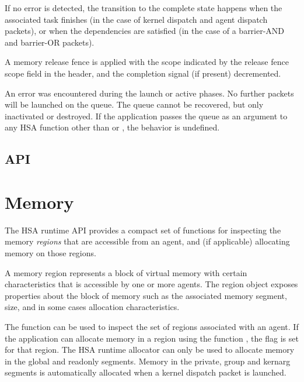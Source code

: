\documentclass[final,oneside]{book}
\begin{document}
\begin{description}[itemsep=2pt,leftmargin=0cm, labelindent=0cm]
  If no error is detected, the transition to the complete state happens when the
  associated task finishes (in the case of kernel dispatch and agent dispatch
  packets), or when the dependencies are satisfied (in the case of a barrier-AND
  and barrier-OR packets).

\item[Complete] A memory release fence is applied with the scope indicated by
  the release fence scope field in the header, and the completion signal (if
  present) decremented.

\item[Error] An error was encountered during the launch or active phases. No
  further packets will be launched on the queue. The queue cannot be recovered,
  but only inactivated or destroyed. If the application passes the queue as an
  argument to any HSA function other than  or
  , the behavior is undefined.

\end{description}


\subsection{API}


\section{Memory}\label{sec:memory}

The HSA runtime API provides a compact set of functions for inspecting the
memory \emph{regions} that are accessible from an agent, and (if applicable)
allocating memory on those regions.

A memory region represents a block of virtual memory with certain
characteristics that is accessible by one or more agents. The region object
 exposes properties about the block of memory such as the
associated memory segment, size, and in some cases allocation characteristics.

The function  can be used to inspect the set
of regions associated with an agent.  If the application can allocate memory
in a region using the function , the flag
 is set for that region. The HSA
runtime allocator can only be used to allocate memory in the global and readonly
segments. Memory in the private, group and kernarg segments is automatically
allocated when a kernel dispatch packet is launched.
\end{document}
